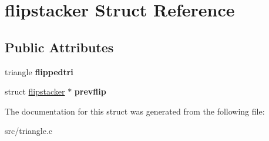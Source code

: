 \hypertarget{structflipstacker}{
\section{flipstacker Struct Reference}
\label{structflipstacker}
}
\subsection*{Public Attributes}
\begin{DoxyCompactItemize}
\item 
\hypertarget{structflipstacker_af476effffe8e2f8f2af7108d0f18e7c7}{
triangle {\bfseries flippedtri}}
\label{structflipstacker_af476effffe8e2f8f2af7108d0f18e7c7}

\item 
\hypertarget{structflipstacker_aab8edb201c23d9f1d7955950f341230d}{
struct \hyperlink{structflipstacker}{flipstacker} $\ast$ {\bfseries prevflip}}
\label{structflipstacker_aab8edb201c23d9f1d7955950f341230d}

\end{DoxyCompactItemize}


The documentation for this struct was generated from the following file:\begin{DoxyCompactItemize}
\item 
src/triangle.c\end{DoxyCompactItemize}
